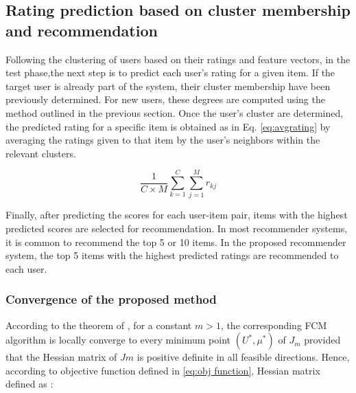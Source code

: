 \documentclass{article}
\begin{document}
\subsection{Rating prediction based on cluster membership and recommendation}
Following the clustering of users based on their ratings and feature vectors, in the test phase,the next step is to predict each user's rating for a given item. If the target user is already part of the system, their cluster membership have been previously determined. For new users, these degrees are computed using the method outlined in the previous section. Once the user’s cluster are determined, the predicted rating for a specific item is obtained as in Eq. \ref{eq:avgrating} by averaging the ratings given to that item by the user’s neighbors within the relevant clusters.

\begin{equation}\label{eq:avgrating}
    \frac{1}{C \times M} \sum_{k=1}^{C} \sum_{j=1}^{M} r_{kj}
\end{equation}

Finally, after predicting the scores for each user-item pair, items with the highest predicted scores are selected for recommendation. In most recommender systems, it is common to recommend the top 5 or 10 items. In the proposed recommender system, the top 5 items with the highest predicted ratings are recommended to each user.


\subsubsection{Convergence of the proposed method}
According to the theorem of \cite{hathaway1986local}, for a constant $m>1$, the corresponding FCM algorithm is locally converge to every minimum point $(U^*, \mu^*)$ of $J_m$ provided that the Hessian matrix of $Jm$ is positive definite in all feasible directions. 
Hence, according to objective function defined in \ref{eq:obj function}, Hessian matrix defined as :
\end{document}
